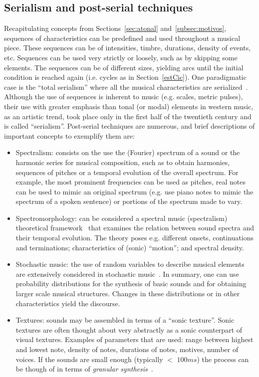 \subsection{Serialism and post-serial techniques}
Recapitulating concepts from Sections~\ref{sec:atonal} and~\ref{subsec:motivos},
sequences of characteristics can be predefined and
used throughout a musical piece.
These sequences can be of intensities, timbre, durations,
density of events, etc.
Sequences can be used very strictly or loosely,
such as by skipping some elements.
The sequences can be of different sizes, yielding arcs
until the initial condition is reached again (i.e. cycles as in Section~\ref{estCic}).
One paradigmatic case is the ``total serialism'' where all
the musical characteristics are serialized~\cite{Lovelock}.
Although the use of sequences is inherent to music (e.g. scales, metric pulses),
their use with greater emphasis than tonal (or modal) elements
in western music, as an artistic trend, took place only in the
first half of the twentieth century and is called ``serialism''.
Post-serial techniques are numerous, and brief descriptions of
important concepts to exemplify them are:
\begin{itemize}
	\item Spectralism:
		consists on the use the (Fourier) spectrum of a sound or the harmonic series for musical composition,
		such as
		to obtain harmonies, sequences of pitches or a temporal evolution of the overall spectrum.
		For example, the most prominent frequencies can be used as pitches,
		real notes can be used to mimic an original spectrum
		(e.g. use piano notes to mimic the spectrum of a spoken sentence) or portions of the spectrum made to vary.~\cite{grisey}
	\item Spectromorphology:
		can be considered a spectral music (spectralism) theoretical framework~\cite{smalley,schaeffer}
		that examines the relation between sound spectra and their temporal evolution.
		The theory poses e.g. different onsets, continuations and terminations; characteristics of (sonic) ``motion'';
		and spectral density.
	\item Stochastic music:
		the use of random variables to describe musical elements are extensively considered in stochastic music~\cite{formalized}.
		In summary, one can use probability distributions for the synthesis of basic sounds and for obtaining larger scale musical structures.
		Changes in these distributions or in other characteristics yield the discourse.
	\item Textures:
		sounds may be assembled in terms of a ``sonic texture''.
		Sonic textures are often thought about very abstractly
		as a sonic counterpart of visual textures.
		Examples of parameters that are used: range between highest and lowest note,
		density of notes, durations of notes, motives, number of voices.
		If the sounds are small enough (typically $<$ $100ms$) the process can be though of in terms of \emph{granular synthesis}~\cite{microsound}.
\end{itemize}

